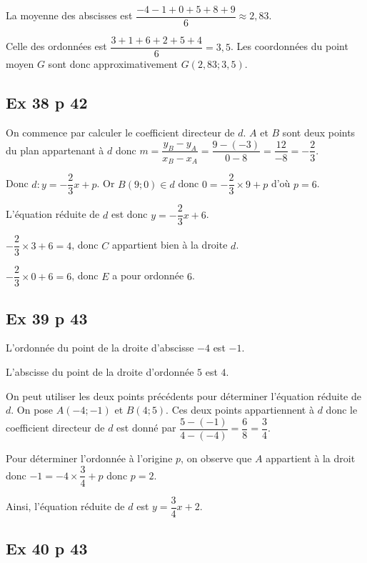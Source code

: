 \documentclass[12pt,a4paper]{book}
\begin{document}
La moyenne des abscisses est $\dfrac{-4-1+0+5+8+9}{6} \approx 2,83$.

Celle des ordonnées est $\dfrac{3+1+6+2+5+4}{6} = 3,5$. Les coordonnées du point moyen $G$ sont donc approximativement $G(2,83;3,5)$.

\subsection*{Ex 38 p 42}


\begin{enumMet}
	\item On commence par calculer le coefficient directeur de $d$. $A$ et $B$ sont deux points du plan appartenant à $d$ donc $m=\dfrac{y_B-y_A}{x_B-x_A} = \dfrac{9-(-3)}{0-8} = \dfrac{12}{-8} = -\dfrac{2}{3}$. 
	
	Donc $d:y=-\dfrac{2}{3}x+p$. Or $B(9;0)\in d$ donc $0 = -\dfrac{2}{3}\times 9+p$ d'où $p=6$.
	
	L'équation réduite de $d$ est donc $y = -\dfrac{2}{3}x +6$.
	\item $-\dfrac{2}{3} \times 3 +6 = 4$, donc $C$ appartient bien à la droite $d$.
	\item $-\dfrac{2}{3} \times 0 +6 = 6$, donc $E$ a pour ordonnée $6$.
\end{enumMet}

\subsection*{Ex 39 p 43}


\begin{enumMet}
	\item L'ordonnée du point de la droite d'abscisse $-4$ est $-1$.
	\item L'abscisse du point de la droite d'ordonnée $5$ est $4$.
	\item On peut utiliser les deux points précédents pour déterminer l'équation réduite de $d$. On pose $A(-4;-1)$ et $B(4;5)$. Ces deux points appartiennent à $d$ donc le coefficient directeur de $d$ est donné par $\dfrac{5-(-1)}{4-(-4)} =\dfrac{6}{8}= \dfrac{3}{4}$.
	
	Pour déterminer l'ordonnée à l'origine $p$, on observe que $A$ appartient à la droit donc $-1=-4\times\dfrac{3}{4}+p$ donc $p=2$.
	
	Ainsi, l'équation réduite de $d$ est $y = \dfrac{3}{4}x +2$.
\end{enumMet}

\subsection*{Ex 40 p 43}
\end{document}
